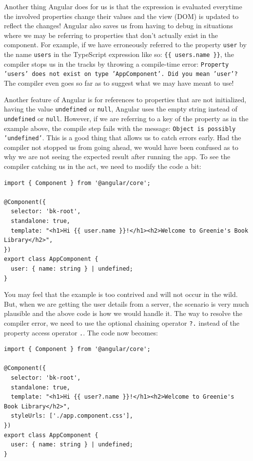 \documentclass{report}
\begin{document}
Another thing Angular does for us is that the expression is evaluated everytime the involved properties change their values and the view (DOM) is updated to reflect the changes! Angular also saves us from having to debug in situations where we may be referring to properties that don't actually exist in the component. For example, if we have erroneously referred to the property \verb|user| by the name \verb|users| in the TypeScript expression like so: \verb|{{ users.name }}|, the compiler stops us in the tracks by throwing a compile-time error: \texttt{Property 'users' does not exist on type 'AppComponent'. Did you mean 'user'?} The compiler even goes so far as to suggest what we may have meant to use!

Another feature of Angular is for references to properties that are not initialized, having the value \verb|undefined| or \verb|null|, Angular uses the empty string instead of \verb|undefined| or \verb|null|. However, if we are referring to a key of the property as in the example above, the compile step fails with the message: \texttt{Object is possibly 'undefined'}. This is a good thing that allows us to catch errors early. Had the compiler not stopped us from going ahead, we would have been confused as to why we are not seeing the expected result after running the app. To see the compiler catching us in the act, we need to modify the code a bit:

\begin{Verbatim}[label=v2.1.1a]
import { Component } from '@angular/core';

@Component({
  selector: 'bk-root',
  standalone: true,
  template: "<h1>Hi {{ user.name }}!</h1><h2>Welcome to Greenie's Book Library</h2>",
})
export class AppComponent {
  user: { name: string } | undefined;
}
\end{Verbatim}

You may feel that the example is too contrived and will not occur in the wild. But, when we are getting the user details from a server, the scenario is very much plausible and the above code is how we would handle it. The way to resolve the compiler error, we need to use the optional chaining operator \verb|?.| instead of the property access operator \verb|.|. The code now becomes:

\begin{Verbatim}[label=v2.1.2]
import { Component } from '@angular/core';

@Component({
  selector: 'bk-root',
  standalone: true,
  template: "<h1>Hi {{ user?.name }}!</h1><h2>Welcome to Greenie's Book Library</h2>",
  styleUrls: ['./app.component.css'],
})
export class AppComponent {
  user: { name: string } | undefined;
}
\end{Verbatim}
\end{document}
